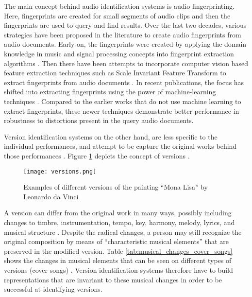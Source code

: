 \documentclass[../main.tex]{subfiles}
\begin{document}
\par
The main concept behind audio identification systems is audio fingerprinting. Here, fingerprints are created for small segments of audio clips and then the fingerprints are  used to query and find results. Over the last two decades, various strategies have been proposed in the literature to create audio fingerprints from audio documents. Early on, the fingerprints were created by applying the domain knowledge in music and signal processing concepts into fingerprint extraction algorithms  \cite{haitsmaHighlyRobustAudio2002,wangIndustrialStrengthAudio2003,ellisEchoPrintOpenSource2011,miroMASKRobustLocal2012,sixPanakoScalableAcoustic2014}. Then there have been attempts to incorporate computer vision based feature extraction techniques such as Scale Invariant Feature Transform to extract fingerprints from audio documents \cite{computer_vision_for_music_identification,sift}. In recent publications, the focus has shifted into extracting fingerprints using the power of machine-learning techniques \cite{arcas_now_2017,baez_suarez_unsupervised_2020,yu_contrastive_2020}. Compared to the earlier works that do not use machine learning to extract fingerprints, these newer techniques demonstrate better performance in robustness to distortions present in the query audio documents. 
\\
\par
Version identification systems on the other hand, are less specific to the individual performances, and attempt to be capture the original works behind those performances \cite{serraAudioCoverSong2010}. Figure \ref{fig:versions} depicts the concept of versions \cite{book}.
\begin{figure}[H]
    \centering
    \texttt{[image: versions.png]}
    \caption{Examples of different versions of the painting “Mona Lisa” by Leonardo da Vinci}
    \label{fig:versions}
\end{figure}

\par
A version can differ from the original work in many ways, possibly including changes to timbre, instrumentation, tempo, key, harmony, melody, lyrics, and musical structure \cite{book}. Despite the radical changes, a person may still recognize the original composition by means of “characteristic musical elements” that are preserved in the modified version. Table \ref{tab:musical_changes_cover_songs} shows the changes in musical elements that can be seen on different types of versions (cover songs) \cite{serraAudioCoverSong2010}. Version identification systems therefore have to build representations that are invariant to these musical changes in order to be successful at identifying versions.
\end{document}
